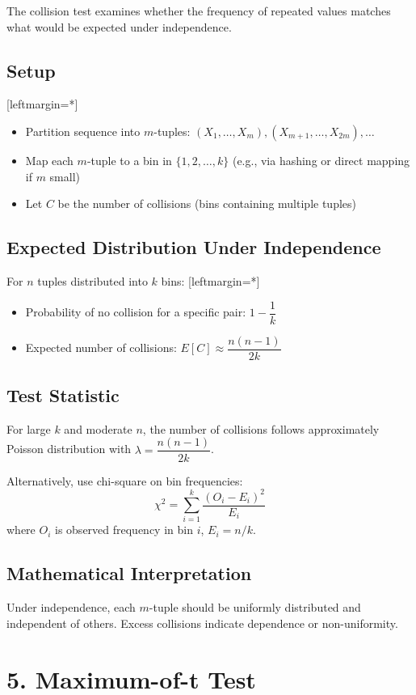 \documentclass[12pt]{article}
\begin{document}
The collision test examines whether the frequency of repeated values matches what would be expected under independence.

\subsection*{Setup}
[leftmargin=*]
\begin{itemize}
    \item Partition sequence into $m$-tuples: $(X_1, \dots, X_m), (X_{m+1}, \dots, X_{2m}), \dots$
    \item Map each $m$-tuple to a bin in $\{1, 2, \dots, k\}$ (e.g., via hashing or direct mapping if $m$ small)
    \item Let $C$ be the number of collisions (bins containing multiple tuples)
\end{itemize}
\subsection*{Expected Distribution Under Independence}
For $n$ tuples distributed into $k$ bins:
[leftmargin=*] \begin{itemize}
    \item Probability of no collision for a specific pair: $1 - \dfrac{1}{k}$
    \item Expected number of collisions: $E[C] \approx \dfrac{n(n-1)}{2k}$
\end{itemize}
\subsection*{Test Statistic}
For large $k$ and moderate $n$, the number of collisions follows approximately Poisson distribution with $\lambda = \dfrac{n(n-1)}{2k}$.

Alternatively, use chi-square on bin frequencies:
\[
\chi^2 = \sum_{i=1}^k \frac{(O_i - E_i)^2}{E_i}
\]
where $O_i$ is observed frequency in bin $i$, $E_i = n/k$.

\subsection*{Mathematical Interpretation}
Under independence, each $m$-tuple should be uniformly distributed and independent of others. Excess collisions indicate dependence or non-uniformity.

\section*{5. Maximum-of-t Test}
\end{document}
